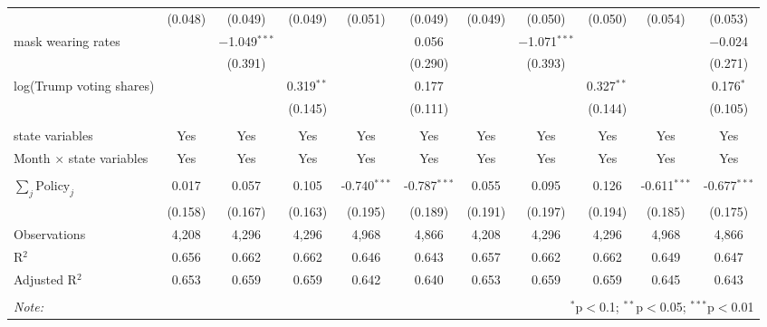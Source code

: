 \begin{tabular}{@{\extracolsep{1pt}}lcccccccccc}
  & (0.048) & (0.049) & (0.049) & (0.051) & (0.049) & (0.049) & (0.050) & (0.050) & (0.054) & (0.053) \\ 
  mask wearing rates &  & $-$1.049$^{***}$ &  &  & 0.056 &  & $-$1.071$^{***}$ &  &  & $-$0.024 \\ 
  &  & (0.391) &  &  & (0.290) &  & (0.393) &  &  & (0.271) \\ 
  log(Trump voting shares) &  &  & 0.319$^{**}$ &  & 0.177 &  &  & 0.327$^{**}$ &  & 0.176$^{*}$ \\ 
  &  &  & (0.145) &  & (0.111) &  &  & (0.144) &  & (0.105) \\ 
 \hline \\[-1.8ex] 
state variables & Yes & Yes & Yes & Yes & Yes & Yes & Yes & Yes & Yes & Yes \\ 
Month $\times$ state variables & Yes & Yes & Yes & Yes & Yes & Yes & Yes & Yes & Yes & Yes \\ 
\hline \\[-1.8ex] 
$\sum_j \mathrm{Policy}_j$ & 0.017 & 0.057 & 0.105 & -0.740$^{***}$ & -0.787$^{***}$ & 0.055 & 0.095 & 0.126 & -0.611$^{***}$ & -0.677$^{***}$ \\ 
 & (0.158) & (0.167) & (0.163) & (0.195) & (0.189) & (0.191) & (0.197) & (0.194) & (0.185) & (0.175) \\ 
Observations & 4,208 & 4,296 & 4,296 & 4,968 & 4,866 & 4,208 & 4,296 & 4,296 & 4,968 & 4,866 \\ 
R$^{2}$ & 0.656 & 0.662 & 0.662 & 0.646 & 0.643 & 0.657 & 0.662 & 0.662 & 0.649 & 0.647 \\ 
Adjusted R$^{2}$ & 0.653 & 0.659 & 0.659 & 0.642 & 0.640 & 0.653 & 0.659 & 0.659 & 0.645 & 0.643 \\ 
\hline 
\hline \\[-1.8ex] 
\textit{Note:}  & \multicolumn{10}{r}{$^{*}$p$<$0.1; $^{**}$p$<$0.05; $^{***}$p$<$0.01} \\ 
\end{tabular} 